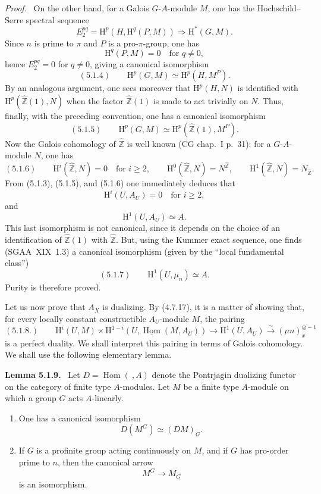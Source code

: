 \documentclass[11pt]{article}
\providecommand{\uHom}{\underline{\Hom}}
\newenvironment{statement}[1]{\par\medskip\noindent\textbf{#1.}\ }{\par\medskip}
\newenvironment{prooftext}[1][Proof]{\par\noindent\emph{#1.}\ }{\par\medskip}
\renewcommand{\H}{\mathrm{H}}
\DeclareMathOperator{\Hom}{Hom}
\newcommand{\Z}{\mathbb{Z}}
\providecommand{\Hom}{\operatorname{Hom}}
\providecommand{\Z}{\mathbb Z}
\providecommand{\Hom}{\operatorname{Hom}}
\begin{document}
\begin{prooftext}[Proof]
On the other hand, for a Galois $G$-$A$-module $M$, one has the Hochschild--Serre spectral sequence
\[
E_2^{pq}=\H^p(H,\H^q(P,M))\Longrightarrow \H^{*}(G,M).
\]
Since $n$ is prime to $\pi$ and $P$ is a pro-$\pi$-group, one has
\[
\H^q(P,M)=0\quad\text{for }q\ne0,
\]
hence $E_2^{pq}=0$ for $q\ne0$, giving a canonical isomorphism
\[
(5.1.4)\qquad \H^p(G,M)\simeq \H^p(H,M^P).
\]
By an analogous argument, one sees moreover that $\H^p(H,N)$ is identified with $\H^p(\widehat{\Z}(1),N)$ when the factor $\widehat{\Z}(1)$ is made to act trivially on $N$. Thus, finally, with the preceding convention, one has a canonical isomorphism
\[
(5.1.5)\qquad \H^p(G,M)\simeq \H^p(\widehat{\Z}(1),M^P).
\]
Now the Galois cohomology of $\widehat{\Z}$ is well known (CG chap.~I p.~31): for a $G$-$A$-module $N$, one has
\[
(5.1.6)\qquad
\H^i(\widehat{\Z},N)=0\quad\text{for }i\geqslant2,
\qquad
\H^0(\widehat{\Z},N)=N^{\widehat{\Z}},
\qquad
\H^1(\widehat{\Z},N)=N_{\widehat{\Z}}.
\]
From (5.1.3), (5.1.5), and (5.1.6) one immediately deduces that
\[
\H^i(U,A_U)=0\quad\text{for }i\geqslant2,
\]
and
\[
\H^1(U,A_U)\simeq A.
\]
This last isomorphism is not canonical, since it depends on the choice of an identification of $\widehat{\Z}(1)$ with $\widehat{\Z}$. But, using the Kummer exact sequence, one finds (SGAA~XIX~1.3) a canonical isomorphism (given by the ``local fundamental class'')
\[
(5.1.7)\qquad \H^1(U,\mu_n)\simeq A.
\]
Purity is therefore proved.

Let us now prove that $A_X$ is dualizing. By (4.7.17), it is a matter of showing that, for every locally constant constructible $A_U$-module $M$, the pairing
\[
(5.1.8.)\qquad \H^i(U,M)\times\H^{1-i}(U,\uHom(M,A_U))\longrightarrow \H^1(U,A_U)\xrightarrow{\sim}(\mu n)_x^{\otimes -1}
\]
is a perfect duality. We shall interpret this pairing in terms of Galois cohomology. We shall use the following elementary lemma.
\end{prooftext}

\begin{statement}{Lemma 5.1.9}
Let $D=\Hom(\ ,A)$ denote the Pontrjagin dualizing functor on the category of finite type $A$-modules. Let $M$ be a finite type $A$-module on which a group $G$ acts $A$-linearly.
\begin{enumerate}[label=(\roman*)]
\item One has a canonical isomorphism
\[
D(M^G)\simeq (DM)_G.
\]
\item If $G$ is a profinite group acting continuously on $M$, and if $G$ has pro-order prime to $n$, then the canonical arrow
\[
M^G\longrightarrow M_G
\]
is an isomorphism.
\end{enumerate}
\end{statement}
\end{document}
